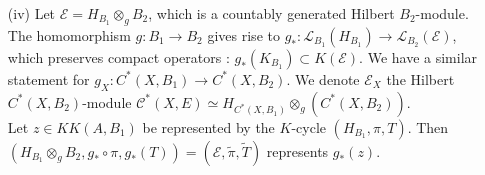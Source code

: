 \begin{dem}
\begin{enumerate}
\item[(iv)] Let $\mathcal E = H_{B_1}\otimes_g B_2$, which is a countably generated Hilbert $B_2$-module. The homomorphism $g:B_1\rightarrow B_2$ gives rise to $g_* : \mathcal L_{B_1}(H_{B_1})\rightarrow \mathcal L_{B_2}(\mathcal E)$, which preserves compact operators : $g_*(K_{B_1})\subset K(\mathcal E)$. We have a similar statement for $g_X : C^*(X,B_1)\rightarrow C^*(X,B_2)$. We denote $\mathcal E_X$ the Hilbert $C^*(X,B_2)$-module $\mathcal C^*(X,E)\simeq H_{C^*(X,B_1)}\otimes_g (C^*(X,B_2))$.\\

Let $z\in KK(A,B_1)$ be represented by the $K$-cycle $(H_{B_1},\pi,T)$. Then $(H_{B_1}\otimes_g B_2,g_*\circ\pi, g_*(T))=(\mathcal E, \tilde\pi,\tilde T)$ represents $g_*(z)$.\\


\end{enumerate}
\end{dem}
